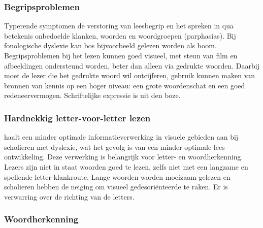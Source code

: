 
\subsubsection{Begripsproblemen}

Typerende symptomen de verstoring van leesbegrip en het spreken in qua betekenis onbedoelde klanken, woorden en woordgroepen (parphasias). Bij fonologische dyslexie kan bos bijvoorbeeld gelezen worden als boom. Begripsproblemen bij het lezen kunnen goed visueel, met steun van film en afbeeldingen ondersteund worden, beter dan alleen via gedrukte woorden. Daarbij moet de lezer die het gedrukte woord wil ontcijferen, gebruik kunnen maken van bronnen van kennis op een hoger niveau: een grote woordenschat en een goed redeneervermogen. Schriftelijke expressie is uit den boze.

\subsubsection{Hardnekkig letter-voor-letter lezen}

\textcite{Bonte2020} haalt een minder optimale informatieverwerking in visuele gebieden aan bij scholieren met dyslexie, wat het gevolg is van een minder optimale lees ontwikkeling. Deze verwerking is belangrijk voor letter- en woordherkenning. Lezers zijn niet in staat woorden goed te lezen, zelfs niet met een langzame en spellende letter-klankroute. Lange woorden worden moeizaam gelezen en scholieren hebben de neiging om visueel gedesoriënteerde te raken. Er is verwarring over de richting van de letters.

\subsubsection{Woordherkenning}







